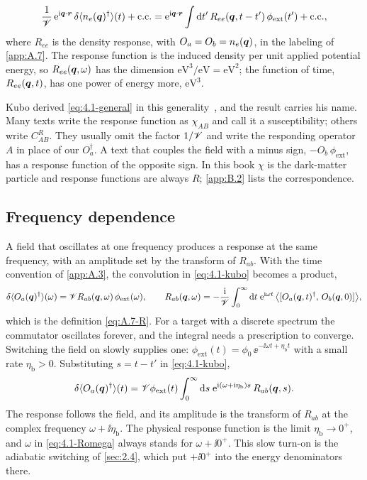 \begin{equation*}
  \frac{1}{\mathscr{V}}\,\mathrm{e}^{\mathrm{i}\bm{q}\cdot\bm{r}}\,\delta\langle n_e(\bm{q})^\dagger\rangle(t) + \text{c.c.}
  = \mathrm{e}^{\mathrm{i}\bm{q}\cdot\bm{r}}\int\mathrm{d} t'\,R_{ee}(\bm{q}, t - t')\,\phi_{\mathrm{ext}}(t') + \text{c.c.},
\end{equation*}
where $R_{ee}$ is the density response, with $O_a = O_b = n_e(\bm{q})$, in the labeling of \cref{app:A.7}. The response function is the induced density per unit applied potential energy, so $R_{ee}(\bm{q},\omega)$ has the dimension $\mathrm{eV}^3/\mathrm{eV} = \mathrm{eV}^2$; the function of time, $R_{ee}(\bm{q},t)$, has one power of energy more, $\mathrm{eV}^3$.

Kubo derived \cref{eq:4.1-general} in this generality~\cite{kubo1957statistical}, and the result carries his name. Many texts write the response function as $\chi_{AB}$ and call it a susceptibility; others write $C^R_{AB}$. They usually omit the factor $1/\mathscr{V}$ and write the responding operator $A$ in place of our $O_a^\dagger$. A text that couples the field with a minus sign, $-O_b\,\phi_{\mathrm{ext}}$, has a response function of the opposite sign. In this book $\chi$ is the dark-matter particle and response functions are always $R$; \cref{app:B.2} lists the correspondence.

\subsection{Frequency dependence}

A field that oscillates at one frequency produces a response at the same frequency, with an amplitude set by the transform of $R_{ab}$. With the time convention of \cref{app:A.3}, the convolution in \cref{eq:4.1-kubo} becomes a product,
\begin{equation}
  \delta\langle O_a(\bm{q})^\dagger\rangle(\omega) = \mathscr{V} R_{ab}(\bm{q},\omega)\,\phi_{\mathrm{ext}}(\omega), \qquad
  R_{ab}(\bm{q},\omega) = -\frac{\mathrm{i}}{\mathscr{V}}\int_0^\infty\mathrm{d} t\;\mathrm{e}^{\mathrm{i}\omega t}\,\bigl\langle[O_a(\bm{q},t)^\dagger,\,O_b(\bm{q},0)]\bigr\rangle ,
  \label{eq:4.1-Romega}
\end{equation}
which is the definition \cref{eq:A.7-R}. For a target with a discrete spectrum the commutator oscillates forever, and the integral needs a prescription to converge. Switching the field on slowly supplies one: $\phi_{\mathrm{ext}}(t) = \phi_0\,\ee^{-\ii\omega t + \eta_{\mathrm{b}}t}$ with a small rate $\eta_{\mathrm{b}} > 0$. Substituting $s = t - t'$ in \cref{eq:4.1-kubo},
\begin{equation*}
  \delta\langle O_a(\bm{q})^\dagger\rangle(t) = \mathscr{V}\phi_{\mathrm{ext}}(t)\int_0^\infty\mathrm{d} s\;\mathrm{e}^{\mathrm{i}(\omega + \mathrm{i}\eta_{\mathrm{b}})s}\,R_{ab}(\bm{q},s) .
\end{equation*}
The response follows the field, and its amplitude is the transform of $R_{ab}$ at the complex frequency $\omega + \ii\eta_{\mathrm{b}}$. The physical response function is the limit $\eta_{\mathrm{b}} \to 0^+$, and $\omega$ in \cref{eq:4.1-Romega} always stands for $\omega + \ii0^+$. This slow turn-on is the adiabatic switching of \cref{sec:2.4}, which put $+\ii0^+$ into the energy denominators there.

